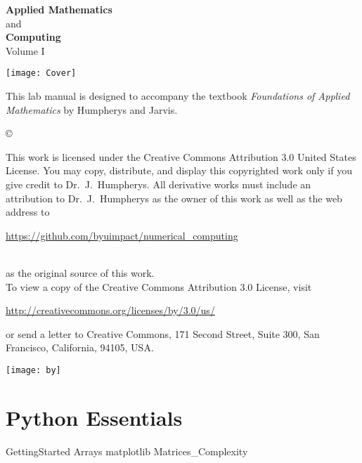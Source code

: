 \documentclass[nociteref]{SIAM-GH-book}
\begin{document}



\thispagestyle{empty}
\begin{center}
{\huge \bf Applied Mathematics} \\ and \\ {\huge \bf Computing} \\
\vspace{5mm}
{\Large Volume I}
\vspace{20mm}

\texttt{[image: Cover]}
\end{center}
\frontmatter




\begin{thepreface}
This lab manual is designed to accompany the textbook \emph{Foundations of Applied Mathematics} by Humpherys and Jarvis.

\vfill
\copyright{This work is licensed under the Creative Commons Attribution 3.0 United States
License.  You may copy, distribute, and display this copyrighted work only if you give
credit to Dr.~J.~Humpherys. All derivative works must include an attribution to Dr.~J.~Humpherys as the owner of this work as well as the web address to
\\\centerline{\url{https://github.com/byuimpact/numerical_computing}}\\ as the original source of
this
work.\\To view a copy of the Creative Commons Attribution 3.0 License,
visit\\\centerline{\url{http://creativecommons.org/licenses/by/3.0/us/}} or send a letter to
Creative Commons, 171 Second Street, Suite 300, San Francisco, California, 94105, USA.}

\vfill
\centering\texttt{[image: by]}
\vfill
\end{thepreface}

\setcounter{tocdepth}{1}
\tableofcontents

\mainmatter
\part{Python Essentials}
{GettingStarted}
{Arrays}
{matplotlib}
{Matrices_Complexity}
\end{document}
